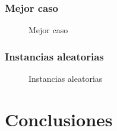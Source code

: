 \documentclass[a4paper, 10pt, twoside]{article}
\newcommand{\tresgraficos}[3]{
    \newcommand{\separacion}{-2.2em}
    \vspace{\separacion}
    
    \vspace{\separacion}
    
    \vspace{\separacion}
    
}
\begin{document}
\subsubsection{Mejor caso}

\begin{figure}[H]
  \centering
  \tresgraficos{problema3-mejor-caso}
               {problema3-mejor-caso-logn}
               {problema3-mejor-caso-n}
  \caption{Mejor caso}
\end{figure}


\subsubsection{Instancias aleatorias}

\begin{figure}[H]
  \centering
  \tresgraficos{problema3-instancias-aleatorias}
               {problema3-instancias-aleatorias-logn}
               {problema3-instancias-aleatorias-n}
  \caption{Instancias aleatorias}
\end{figure}




\newpage

\section{Conclusiones}






\newpage
\end{document}
